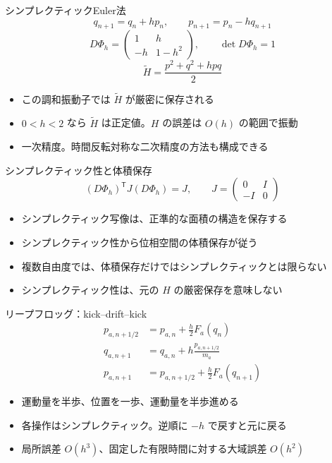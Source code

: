 \documentclass[10pt,aspectratio=169]{beamer}
\begin{document}
\begin{frame}{シンプレクティックEuler法}
\[
q_{n+1}=q_n+hp_n,\qquad p_{n+1}=p_n-hq_{n+1}
\]
\[
D\Phi_h=\begin{pmatrix}1&h\\-h&1-h^2\end{pmatrix},
\qquad \det D\Phi_h=1
\]
\[
\widetilde H=\frac{p^2+q^2+hpq}{2}
\]
\begin{itemize}
\item この調和振動子では $\widetilde H$ が厳密に保存される
\item $0<h<2$ なら $\widetilde H$ は正定値。$H$ の誤差は $O(h)$ の範囲で振動
\item 一次精度。時間反転対称な二次精度の方法も構成できる
\end{itemize}
\end{frame}

\begin{frame}{シンプレクティック性と体積保存}
\[
(D\Phi_h)^{\mathsf T}J(D\Phi_h)=J,
\qquad J=\begin{pmatrix}0&I\\-I&0\end{pmatrix}
\]
\begin{itemize}
\item シンプレクティック写像は、正準的な面積の構造を保存する
\item シンプレクティック性から位相空間の体積保存が従う
\item 複数自由度では、体積保存だけではシンプレクティックとは限らない
\item シンプレクティック性は、元の $H$ の厳密保存を意味しない
\end{itemize}
\end{frame}

\begin{frame}{リープフロッグ：kick--drift--kick}
\[
\begin{aligned}
p_{a,n+1/2}&=p_{a,n}+\frac{h}{2}F_a(q_n)\\
q_{a,n+1}&=q_{a,n}+h\frac{p_{a,n+1/2}}{m_a}\\
p_{a,n+1}&=p_{a,n+1/2}+\frac{h}{2}F_a(q_{n+1})
\end{aligned}
\]
\begin{itemize}
\item 運動量を半歩、位置を一歩、運動量を半歩進める
\item 各操作はシンプレクティック。逆順に $-h$ で戻すと元に戻る
\item 局所誤差 $O(h^3)$、固定した有限時間に対する大域誤差 $O(h^2)$
\end{itemize}
\end{frame}
\end{document}
